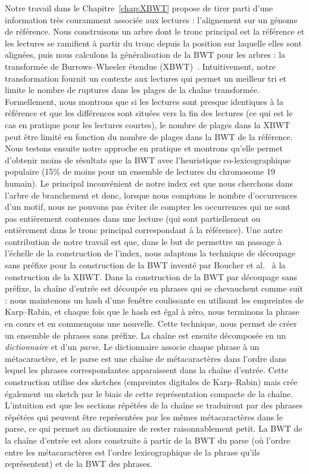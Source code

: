 Notre travail dans le Chapitre~\ref{chap:XBWT} propose de tirer parti d'une information très couramment associée aux lectures : l'alignement sur un génome de référence. Nous construisons un arbre dont le tronc principal est la référence et les lectures se ramifient à partir du tronc depuis la position sur laquelle elles sont alignées, puis nous calculons la généralisation de la BWT pour les arbres : la transformée de Burrows--Wheeler étendue (XBWT)~\cite{ferragina2009compressing}. Intuitivement, notre transformation fournit un contexte aux lectures qui permet un meilleur tri et limite le nombre de ruptures dans les plages de la chaîne transformée. Formellement, nous montrons que si les lectures sont presque identiques à la référence et que les différences sont situées vers la fin des lectures (ce qui est le cas en pratique pour les lectures courtes), le nombre de plages dans la XBWT peut être limité en fonction du nombre de plages dans la BWT de la référence. Nous testons ensuite notre approche en pratique et montrons qu'elle permet d'obtenir moins de résultats que la BWT avec l'heuristique co-lexicographique populaire (15\% de moins pour un ensemble de lectures du chromosome 19 humain).
Le principal inconvénient de notre index est que nous cherchons dans l'arbre de branchement et donc, lorsque nous comptons le nombre d'occurrences d'un motif, nous ne pouvons pas éviter de compter les occurrences qui ne sont pas entièrement contenues dans une lecture (qui sont partiellement ou entièrement dans le tronc principal correspondant à la référence).
%
Une autre contribution de notre travail est que, dans le but de permettre un passage à l'échelle de la construction de l'index, nous adaptons la technique de découpage sans préfixe pour la construction de la BWT inventé par Boucher et al.~\cite{boucher2019prefix} à la construction de la XBWT. 
%
Dans la construction de la BWT par découpage sans préfixe, la chaîne d'entrée est découpée en phrases qui se chevauchent comme suit : nous maintenons un hash d'une fenêtre coulissante en utilisant les empreintes de Karp--Rabin, et chaque fois que le hash est égal à zéro, nous terminons la phrase en cours et en commençons une nouvelle. Cette technique, nous permet de créer un ensemble de phrases sans préfixe.
La chaîne est ensuite décomposée en un \emph{dictionnaire} et d'un \emph{parse}. 
Le dictionnaire associe chaque phrase à un métacaractère, et le parse est une chaîne de métacaractères dans l'ordre dans lequel les phrases correspondantes apparaissent dans la chaîne d'entrée.
Cette construction utilise des sketches (empreintes digitales de Karp--Rabin) mais crée également un sketch par le biais de cette représentation compacte de la chaîne.
L'intuition est que les sections répétées de la chaîne se traduiront par des phrases répétées qui peuvent être représentées par les mêmes métacaractères dans le parse, ce qui permet au dictionnaire de rester raisonnablement petit.
La BWT de la chaîne d'entrée est alors construite à partir de la BWT du parse (où l'ordre entre les métacaractères est l'ordre lexicographique de la phrase qu'ils représentent) et de la BWT des phrases.